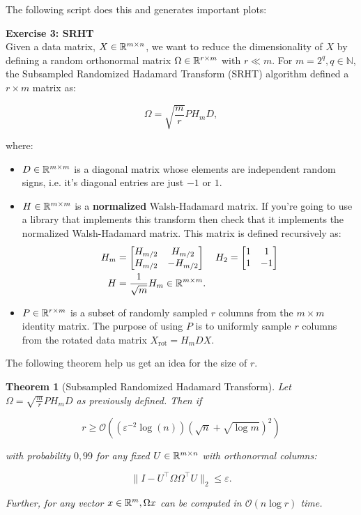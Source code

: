 \documentclass[11pt]{article}
\newcommand\bigO[1]{{\ensuremath{\mathcal{O}(#1)}}}
\newtheorem{theorem}{Theorem}
\begin{document}
The following script does this and generates important plots:


\bigskip

{\bf{Exercise 3: SRHT}}\\

Given a data matrix, $X \in \mathbb{R}^{m \times n}$, we want to reduce the dimensionality of $X$ by defining a random orthonormal matrix $\Omega \in \mathbb{R}^{r \times m}$ with $r \ll m$. For $m = 2^q, q \in \mathbb{N}$, the Subsampled Randomized Hadamard Transform (SRHT) algorithm defined a $r \times m$ matrix as:

\[ \Omega = \sqrt{\frac{m}{r}} PH_{m}D, \]

where:

\begin{itemize}
    \item $D \in \mathbb{R}^{m \times m}$ is a diagonal matrix whose elements are independent random signs, i.e. it's diagonal entries are just $-1$ or $1$.
    \item $H \in \mathbb{R}^{m \times m}$ is a \textbf{normalized} Walsh-Hadamard matrix. If you're going to use a library that implements this transform then check that it implements the normalized Walsh-Hadamard matrix. This matrix is defined recursively as:
    \begin{align*}
    H_m &= \begin{bmatrix} H_{m/2} & H_{m/2} \\ H_{m/2} & -H_{m/2} \end{bmatrix} & H_2 &= \begin{bmatrix} 1 & 1 \\ 1 & -1 \end{bmatrix} \\
    H &= \frac{1}{\sqrt{m}} H_m \in \mathbb{R}^{m \times m}.
    \end{align*}
    \item $P \in \mathbb{R}^{r \times m}$ is a subset of randomly sampled $r$ columns from the $m \times m$ identity matrix. The purpose of using $P$ is to uniformly sample $r$ columns from the rotated data matrix $X_{\text{rot}} = H_{m}DX$.
\end{itemize}

The following theorem help us get an idea for the size of $r$.

\begin{theorem}[Subsampled Randomized Hadamard Transform]
Let $\Omega = \sqrt{\frac{m}{r}} PH_{m}D$ as previously defined. Then if

\[ r \geq \bigO{( \varepsilon^{-2}\log(n)) (\sqrt{n} + \sqrt{\log{m}})^2 }\]

with probability $0,99$ for any fixed $U \in \mathbb{R}^{m \times n}$ with orthonormal columns:

\[ \| I - U^\top \Omega \Omega^\top U\|_2 \leq \varepsilon. \]

Further, for any vector $x \in \mathbb{R}^{m}, \Omega x$ can be computed in $\bigO{n \log{r}}$ time.

\end{theorem}
\end{document}
